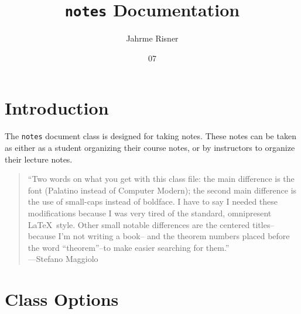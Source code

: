 \documentclass[english,course,twocolumn]{notes}
\title{\texttt{notes} Documentation}
\author{Jahrme Risner}
\date{07}{22}{2016}
\begin{document}
\clearpage

\section{Introduction}
The \verb|notes| document class is designed for taking notes.
These notes can be taken as either as a student organizing their course notes,
or by instructors to organize their lecture notes.

\begin{quote}
``Two words on what you get with this class file:
the main difference is the font (Palatino instead of Computer Modern);
the second main difference is the use of small-caps instead of boldface.
I have to say I needed these modifications because I was very tired of the standard, omnipresent \LaTeX\ style.
Other small notable differences are the centered titles--because I'm not writing a book--
and the theorem numbers placed before the word ``theorem''--to make easier searching for them.''
\\
---Stefano Maggiolo
\end{quote}

\section{Class Options}
\end{document}

